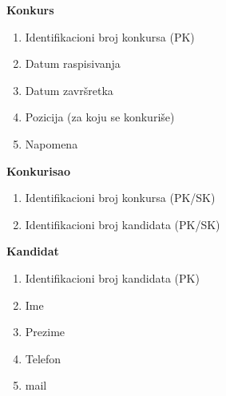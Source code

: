 \noindent \textbf{Konkurs}
\begin{enumerate}
\item Identifikacioni broj konkursa (PK)
\item Datum raspisivanja
\item Datum završretka
\item Pozicija (za koju se konkuriše)
\item Napomena
\end{enumerate}  \vspace{5mm}

\noindent \textbf{Konkurisao}
\begin{enumerate}
\item Identifikacioni broj konkursa (PK/SK)
\item Identifikacioni broj kandidata (PK/SK)
\end{enumerate}  \vspace{5mm}


\noindent \textbf{Kandidat}
\begin{enumerate}
\item Identifikacioni broj kandidata (PK)
\item Ime
\item Prezime
\item Telefon
\item mail
\end{enumerate}  \vspace{5mm}


